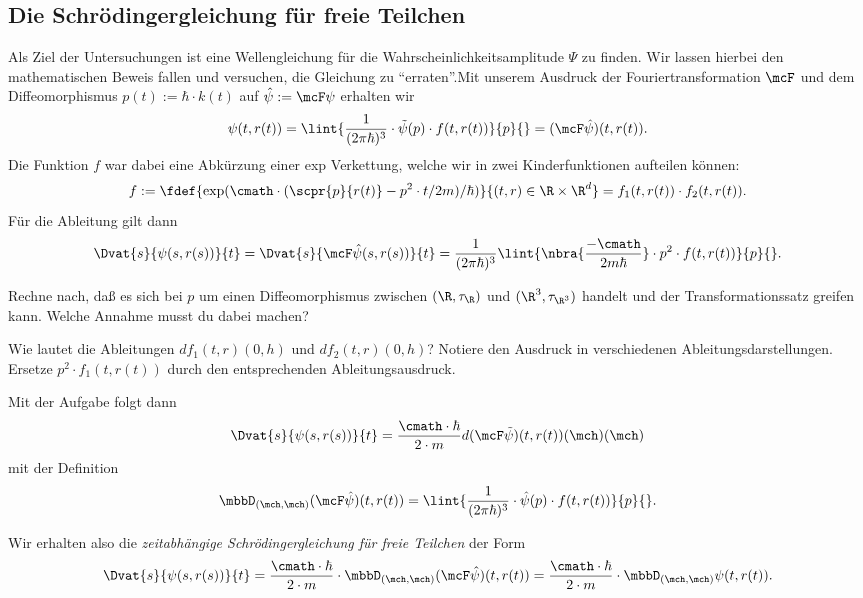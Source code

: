 \documentclass{subfiles}
\begin{document}
    \subsection{Die Schrödingergleichung für freie Teilchen}
    Als Ziel der Untersuchungen ist eine Wellengleichung für die Wahrscheinlichkeitsamplitude $\Psi$ zu finden. Wir lassen hierbei den mathematischen Beweis fallen und versuchen, die Gleichung zu \enquote{erraten}.Mit unserem Ausdruck der Fouriertransformation $\mcF$ und dem Diffeomorphismus $p(t) := \hbar\cdot k(t)$ auf $\hat\psi:=\mcF\psi$ erhalten wir
    \[\psi(t,r(t)) = \lint{\frac{1}{(2\pi\hbar)^3}\cdot\tilde\psi(p)\cdot f(t,r(t))}{p}{} = (\mcF \hat\psi)(t,r(t)).\]
    Die Funktion $f$ war dabei eine Abkürzung einer exp Verkettung, welche wir in zwei Kinderfunktionen aufteilen können:
    \[f:=\fdef{\exp(\cmath\cdot(\scpr{p}{r(t)} - p^2\cdot t/2m)/\hbar)}{(t,r)\in\R\times\R^d} = f_1(t,r(t))\cdot f_2(t,r(t)).\]
    Für die Ableitung gilt dann
    \[\Dvat{s}{\psi(s,r(s))}{t} = \Dvat{s}{\mcF\hat\psi(s,r(s))}{t} = \frac{1}{(2\pi\hbar)^3}\lint{\nbra{\frac{-\cmath}{2m\hbar}}\cdot p^2\cdot f(t,r(t))}{p}{}.\]
    \begin{Aufgabe}
        \nr{} Rechne nach, daß es sich bei $p$ um einen Diffeomorphismus zwischen $(\R,\tau_\R)$ und $(\R^3,\tau_{\R^3})$ handelt und der Transformationssatz greifen kann. Welche Annahme musst du dabei machen?

        \nr{} Wie lautet die Ableitungen $df_1(t,r)(0,h)$ und $df_2(t,r)(0,h)$? Notiere den Ausdruck in verschiedenen Ableitungsdarstellungen. Ersetze $p^2\cdot f_1(t,r(t))$ durch den entsprechenden Ableitungsausdruck. 
    \end{Aufgabe}
    \noindent Mit der Aufgabe folgt dann 
    \[\Dvat{s}{\psi(s,r(s))}{t} = \frac{\cmath\cdot\hbar}{2\cdot m} d(\mcF\tilde\psi)(t,r(t))(\mch)(\mch)\]
    mit der Definition 
    \[\mbbD_{(\mch,\mch)}(\mcF\hat\psi)(t,r(t)) = \lint{\frac{1}{(2\pi\hbar)^3}\cdot\hat\psi(p)\cdot f(t,r(t))}{p}{}.\]
    \begin{whiteframedr}
        Wir erhalten also die \emph{zeitabhängige Schrödingergleichung für freie Teilchen} der Form
        \[\Dvat{s}{\psi(s,r(s))}{t} = \frac{\cmath\cdot\hbar}{2\cdot m}\cdot\mbbD_{(\mch,\mch)}(\mcF\hat\psi)(t,r(t)) = \frac{\cmath\cdot\hbar}{2\cdot m}\cdot\mbbD_{(\mch,\mch)}\psi(t,r(t)).\]
    \end{whiteframedr}
\end{document}
